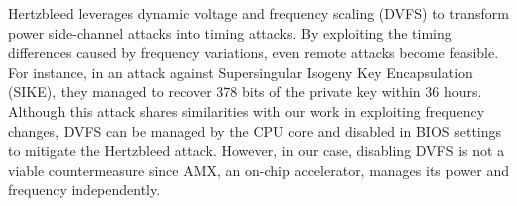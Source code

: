 








Hertzbleed leverages dynamic voltage and frequency scaling (DVFS) to transform power side-channel attacks into timing attacks. By exploiting the timing differences caused by frequency variations, even remote attacks become feasible. For instance, in an attack against Supersingular Isogeny Key Encapsulation (SIKE), they managed to recover 378 bits of the private key within 36 hours. Although this attack shares similarities with our work in exploiting frequency changes, DVFS can be managed by the CPU core and disabled in BIOS settings to mitigate the Hertzbleed attack. However, in our case, disabling DVFS is not a viable countermeasure since AMX, an on-chip accelerator, manages its power and frequency independently.

